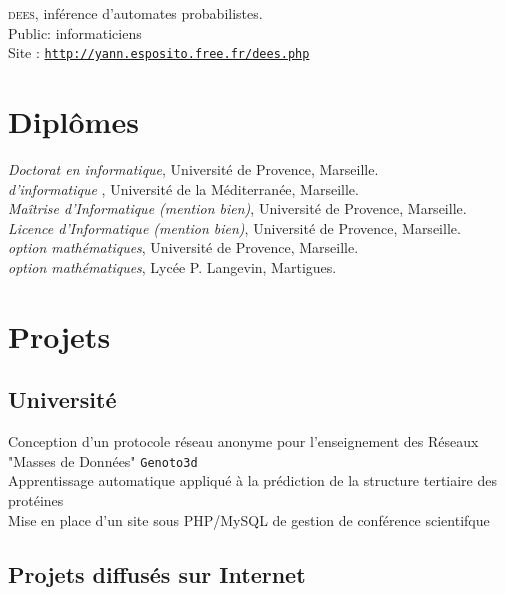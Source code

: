 \textsc{dees}, inférence d'automates probabilistes.\\
{\footnotesize \phantom{espace}Public: informaticiens}\\
{\footnotesize \phantom{espace}Site : \href{http://yann.esposito.free.fr/dees.php}{\texttt{http\string://yann.esposito.free.fr/dees.php}}}

\section*{Diplômes}

\noindent{}\emph{Doctorat en informatique}, Université de Provence, Marseille.\\
\noindent{}\emph{ d'informatique} , Université de la Méditerranée, Marseille.\\
\noindent{}\emph{Maîtrise d'Informatique {\footnotesize(mention bien)}}, Université de Provence, Marseille.\\
\noindent{}\emph{Licence d'Informatique {\footnotesize(mention bien)}}, Université de Provence, Marseille.\\
\noindent{}\emph{ {\footnotesize option mathématiques}}, Université de Provence, Marseille.\\
\noindent{}\emph{ {\footnotesize option mathématiques}}, Lycée P. Langevin, Martigues.\\

\section*{Projets}

\subsection*{Université}

\noindent{}Conception d'un protocole réseau anonyme pour l'enseignement des Réseaux\\
 "Masses de Données" \texttt{Genoto3d}\\
{\phantom{es}\footnotesize Apprentissage automatique appliqué à la prédiction de la structure tertiaire des protéines}\\
Mise en place d'un site sous PHP/MySQL de gestion de conférence scientifque\\

\subsection*{Projets diffusés sur Internet}

